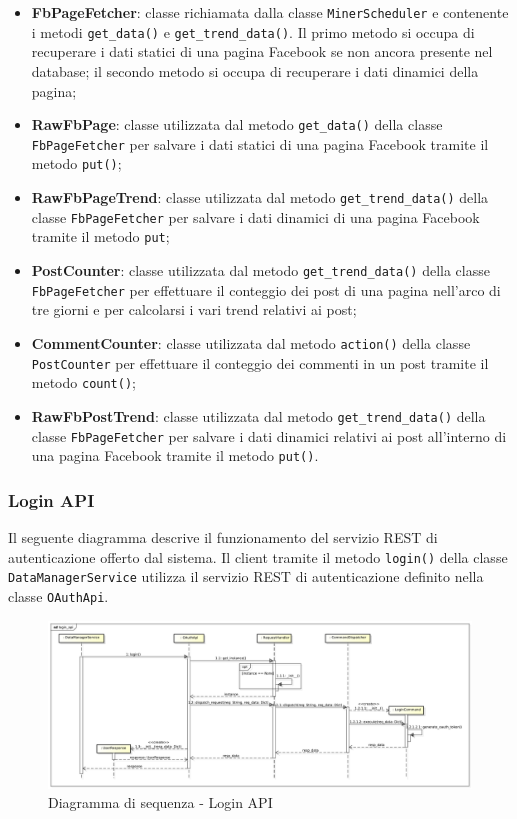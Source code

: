     \begin{itemize}
        \item \textbf{FbPageFetcher}: classe richiamata dalla classe \texttt{MinerScheduler} e contenente i metodi \texttt{get\_data()} e \texttt{get\_trend\_data()}. Il primo metodo si occupa di recuperare i dati statici di una pagina Facebook se non ancora presente nel database; il secondo metodo si occupa di recuperare i dati dinamici della pagina;
        \item \textbf{RawFbPage}: classe utilizzata dal metodo \texttt{get\_data()} della classe \texttt{FbPageFetcher} per salvare i dati statici di una pagina Facebook tramite il metodo \texttt{put()};
        \item \textbf{RawFbPageTrend}: classe utilizzata dal metodo \texttt{get\_trend\_data()} della classe \texttt{FbPageFetcher} per salvare i dati dinamici di una pagina Facebook tramite il metodo \texttt{put};
        \item \textbf{PostCounter}: classe utilizzata dal metodo \texttt{get\_trend\_data()} della classe \texttt{FbPageFetcher} per effettuare il conteggio dei post di una pagina nell'arco di tre giorni e per calcolarsi i vari trend relativi ai post;
        \item \textbf{CommentCounter}: classe utilizzata dal metodo \texttt{action()} della classe \texttt{PostCounter} per effettuare il conteggio dei commenti in un post tramite il metodo \texttt{count()};
        \item \textbf{RawFbPostTrend}: classe utilizzata dal metodo \texttt{get\_trend\_data()} della classe \texttt{FbPageFetcher} per salvare i dati dinamici relativi ai post all'interno di una pagina Facebook tramite il metodo \texttt{put()}.
    \end{itemize}


	\subsubsection{Login API} %
    \label{ssub:login_api}
    Il seguente diagramma descrive il funzionamento del servizio REST di autenticazione offerto dal sistema. Il client tramite il metodo \texttt{login()} della classe \texttt{DataManagerService} utilizza il servizio REST di autenticazione definito nella classe \texttt{OAuthApi}. \newline

    \begin{figure}[!htbp]
		\centering
			\centerline{\includegraphics[angle=90, scale=0.4]{./images/sequence_diagram/login_api.pdf}}
		\caption{Diagramma di sequenza - Login API}
	\end{figure}



